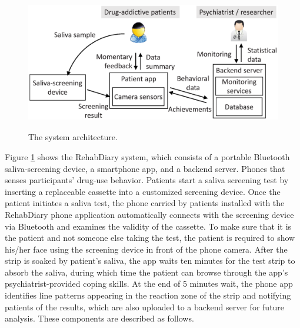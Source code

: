 \begin{figure}[ht]
\begin{center}
\includegraphics[height=6cm]{image/ket/arch.eps}
\caption{The system architecture.}
\label{fig:system_overview}
\end{center}
\end{figure}

Figure \ref{fig:system_overview} shows the RehabDiary system, which consists of a portable Bluetooth saliva-screening device, a smartphone app, and a backend server. Phones that senses participants' drug-use behavior. Patients start a saliva screening test by inserting a replaceable cassette into a customized screening device. Once the patient initiates a saliva test, the phone carried by patients installed with the RehabDiary phone application automatically connects with the screening device via Bluetooth and examines the validity of the cassette. To make sure that it is the patient and not someone else taking the test, the patient is required to show his/her face using the screening device in front of the phone camera. After the strip is soaked by patient's saliva, the app waits ten minutes for the test strip to absorb the saliva, during which time the patient can browse through the app's psychiatrist-provided coping skills. At the end of 5 minutes wait, the phone app identifies line patterns appearing in the reaction zone of the strip and notifying patients of the results, which are also uploaded to a backend server for future analysis. 
These components are described as follows.


